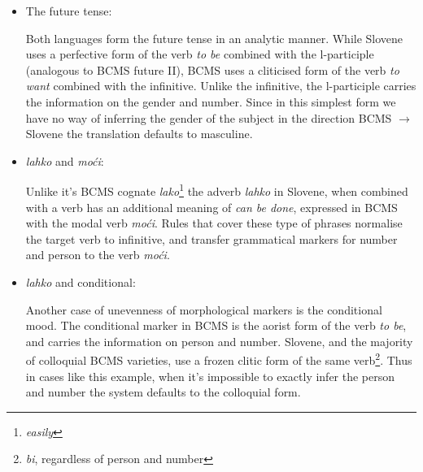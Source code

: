 \begin{itemize}
\item The future tense:

Both languages form the future tense in an analytic manner. While Slovene
uses a perfective form of the verb \emph{to be} combined with the l-participle (analogous
to BCMS future II), BCMS uses a cliticised form of the verb \emph{to
  want} combined with the infinitive. Unlike the infinitive, the
l-participle carries the information on the gender and number. Since
in this simplest form we have no way of inferring the gender of the
subject in the direction BCMS $\rightarrow$ Slovene the translation defaults
to masculine.

\item \emph{lahko} and \emph{moći}:

Unlike it's BCMS cognate \emph{lako}\footnote{\emph{easily}} the adverb \emph{lahko} in
Slovene, when combined with a verb has an additional meaning of \emph{can be
  done}, expressed in BCMS with the modal verb \emph{moći}. Rules that
cover these type of phrases normalise the target verb to infinitive,
and transfer grammatical markers for number and person to the verb \emph{moći}.

\item \emph{lahko} and conditional:

Another case of unevenness of morphological markers is the conditional
mood. The conditional marker in BCMS is the aorist form of the verb
\emph{to be}, and carries the information on person and
number. Slovene, and the majority of colloquial BCMS varieties, use
a frozen clitic form of the same verb\footnote{\emph{bi}, regardless of person and
number}. Thus in cases like this example, when it's impossible to
exactly infer the person and number the system defaults to the
colloquial form.


\end{itemize}
